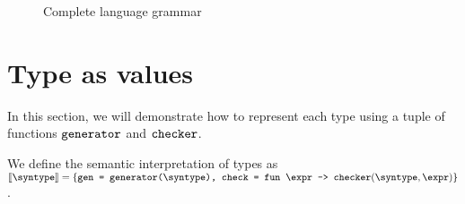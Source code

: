 \begin{figure}[hbt!]%
  \begin{grammar}
            \grule[types]{\syntype}{
                \tint
                \gor \tbool
                \gor \tfun
                \gor \tpoly
                \gor \mkunion{\syntype}{\syntype}
                \gor \mkintersect{\syntype}{\syntype}
                \gor \mktset{\syntype}{\expr}
                \gor \mkdfun{\ev}{\syntype}{\syntype}
                \gor \mkmiu{\alpha}{\syntype}
                \gor \{\overline{\hastype{\elbl}{\syntype}}\}
          }
        \end{grammar}
    \caption{Complete language grammar}
    \label{fig_completeGrammar}
\end{figure}

\section{Type as values}

In this section, we will demonstrate how to represent each type using a tuple of functions $\texttt{generator}$ and $\texttt{checker}$.

\begin{definition}
  \label{def_typeAsVal}
  We define the semantic interpretation of types as $\llbracket \syntype \rrbracket = \{\texttt{gen = \mkgen{\syntype}, check = }\mkfunv{\expr}{\mkche{\syntype}{\expr}}\}$.
\end{definition}

